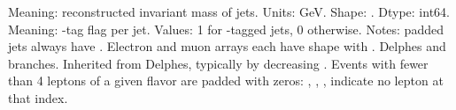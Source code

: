 \markdownRendererUlItem Meaning: reconstructed invariant mass of jets.\markdownRendererUlItemEnd 
\markdownRendererUlItem Units: GeV.\markdownRendererUlItemEnd 
\markdownRendererUlEndTight \markdownRendererInterblockSeparator
{}
\markdownRendererSectionEnd \markdownRendererSectionBegin
{}\markdownRendererInterblockSeparator
{}\markdownRendererUlBeginTight
\markdownRendererUlItem Shape: .\markdownRendererUlItemEnd 
\markdownRendererUlItem Dtype: int64.\markdownRendererUlItemEnd 
\markdownRendererUlItem Meaning: -tag flag per jet.\markdownRendererUlItemEnd 
\markdownRendererUlItem Values: 1 for -tagged jets, 0 otherwise.\markdownRendererUlItemEnd 
\markdownRendererUlItem Notes: padded jets always have .\markdownRendererUlItemEnd 
\markdownRendererUlEndTight \markdownRendererInterblockSeparator
{}
\markdownRendererSectionEnd 
\markdownRendererSectionEnd \markdownRendererSectionBegin
{}\markdownRendererInterblockSeparator
{}Electron and muon arrays each have shape  with .\markdownRendererInterblockSeparator
{}\markdownRendererUlBeginTight
\markdownRendererUlItem {} Delphes  and  branches.\markdownRendererUlItemEnd 
\markdownRendererUlItem {} Inherited from Delphes, typically by decreasing .\markdownRendererUlItemEnd 
\markdownRendererUlItem {} Events with fewer than 4 leptons of a given flavor are padded with zeros:\markdownRendererInterblockSeparator
{}\markdownRendererUlBeginTight
\markdownRendererUlItem {}, , ,  indicate no lepton at that index.\markdownRendererUlItemEnd 
\markdownRendererUlEndTight \markdownRendererUlItemEnd 
\markdownRendererUlEndTight \markdownRendererInterblockSeparator
{}\markdownRendererSectionBegin
{}\markdownRendererInterblockSeparator
